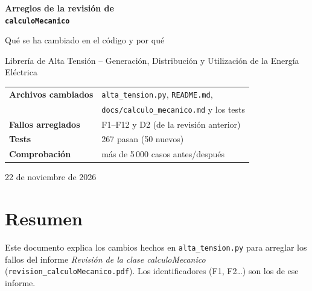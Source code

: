 \documentclass[11pt,a4paper]{article}
\newcommand{\code}[1]{\texttt{#1}}
\begin{document}
\sloppy  %

\begin{titlepage}
\centering
\vspace*{3cm}
{\Huge\bfseries\color{titulo} Arreglos de la revisión de\\[0.3em] \code{calculoMecanico}\par}
\vspace{1cm}
{\Large Qué se ha cambiado en el código y por qué\par}
\vspace{0.4cm}
{\large Librería de Alta Tensión -- Generación, Distribución y Utilización de la Energía Eléctrica\par}
\vspace{2.5cm}
\begin{tcolorbox}[colback=fondo, colframe=titulo, width=0.85\textwidth]
\centering
\begin{tabular}{ll}
\textbf{Archivos cambiados} & \code{alta\_tension.py}, \code{README.md},\\
                            & \code{docs/calculo\_mecanico.md} y los tests\\[0.3em]
\textbf{Fallos arreglados}  & F1--F12 y D2 (de la revisión anterior)\\[0.3em]
\textbf{Tests}              & 267 pasan (50 nuevos)\\[0.3em]
\textbf{Comprobación}       & más de 5\,000 casos antes/después
\end{tabular}
\end{tcolorbox}
\vfill
{\large 22 de noviembre de 2026\par}
\end{titlepage}

\tableofcontents
\newpage

\section{Resumen}

Este documento explica los cambios hechos en \code{alta\_tension.py} para arreglar los fallos del informe \emph{Revisión de la clase calculoMecanico} (\code{revision\_calculoMecanico.pdf}). Los identificadores (F1, F2\ldots) son los de ese informe.
\end{document}

